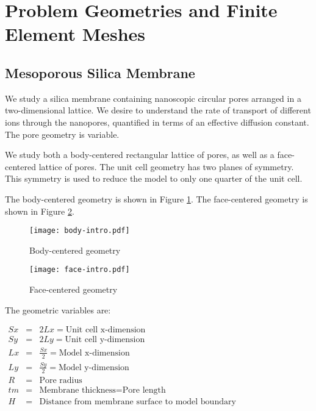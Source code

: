 
\section{Problem Geometries and Finite Element Meshes}\label{sec:geometry-and-mesh}

\subsection{Mesoporous Silica Membrane}\label{subsec:silica_membrane}

We study a silica membrane containing nanoscopic circular pores arranged in a two-dimensional lattice.
We desire to understand the rate of transport of different ions through the nanopores,
quantified in terms of an effective diffusion constant.
The pore geometry is variable.

We study both a body-centered rectangular lattice of pores,
as well as a face-centered lattice of pores.
The unit cell geometry has two planes of symmetry.
This symmetry is used to reduce the model to only one quarter of the unit cell.

The body-centered geometry is shown in Figure \ref{fig:body-intro}.
The face-centered geometry is shown in Figure \ref{fig:face-intro}.

\begin{figure}[H]
\centering
\texttt{[image: body-intro.pdf]}
\caption{Body-centered geometry}
\label{fig:body-intro}
\end{figure}

\begin{figure}[H]
\centering
\texttt{[image: face-intro.pdf]}
\caption{Face-centered geometry}
\label{fig:face-intro}
\end{figure}

The geometric variables are:

$\begin{array}{rcl}
Sx & = & 2 Lx =\text{Unit cell x-dimension} \\
Sy & = & 2 Ly =\text{Unit cell y-dimension} \\
Lx & = & \frac{Sx}{2} =\text{Model x-dimension} \\
Ly & = & \frac{Sy}{2} =\text{Model y-dimension} \\
R & = & \text{Pore radius} \\
tm & = & \text{Membrane thickness} = \text{Pore length} \\
H & = & \text{Distance from membrane surface to model boundary}
\end{array}$

